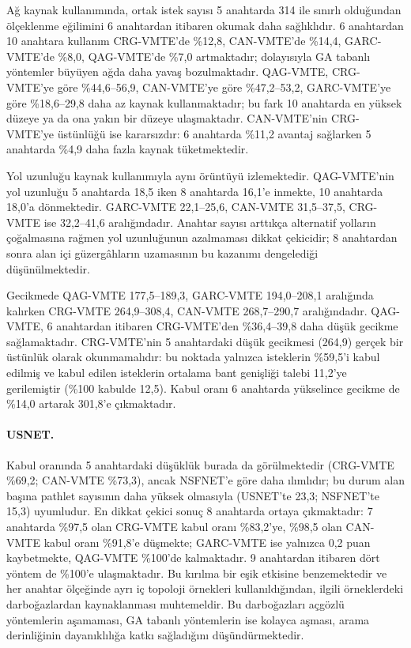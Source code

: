 \documentclass[10pt,twocolumn]{article}
\begin{document}
Ağ kaynak kullanımında, ortak istek sayısı 5 anahtarda 314 ile sınırlı olduğundan ölçeklenme eğilimini 6 anahtardan itibaren okumak daha sağlıklıdır. 6 anahtardan 10 anahtara kullanım CRG-VMTE'de \%12,8, CAN-VMTE'de \%14,4, GARC-VMTE'de \%8,0, QAG-VMTE'de \%7,0 artmaktadır; dolayısıyla GA tabanlı yöntemler büyüyen ağda daha yavaş bozulmaktadır. QAG-VMTE, CRG-VMTE'ye göre \%44,6--56,9, CAN-VMTE'ye göre \%47,2--53,2, GARC-VMTE'ye göre \%18,6--29,8 daha az kaynak kullanmaktadır; bu fark 10 anahtarda en yüksek düzeye ya da ona yakın bir düzeye ulaşmaktadır. CAN-VMTE'nin CRG-VMTE'ye üstünlüğü ise kararsızdır: 6 anahtarda \%11,2 avantaj sağlarken 5 anahtarda \%4,9 daha fazla kaynak tüketmektedir.

Yol uzunluğu kaynak kullanımıyla aynı örüntüyü izlemektedir. QAG-VMTE'nin yol uzunluğu 5 anahtarda 18,5 iken 8 anahtarda 16,1'e inmekte, 10 anahtarda 18,0'a dönmektedir. GARC-VMTE 22,1--25,6, CAN-VMTE 31,5--37,5, CRG-VMTE ise 32,2--41,6 aralığındadır. Anahtar sayısı arttıkça alternatif yolların çoğalmasına rağmen yol uzunluğunun azalmaması dikkat çekicidir; 8 anahtardan sonra alan içi güzergâhların uzamasının bu kazanımı dengelediği düşünülmektedir.

Gecikmede QAG-VMTE 177,5--189,3, GARC-VMTE 194,0--208,1 aralığında kalırken CRG-VMTE 264,9--308,4, CAN-VMTE 268,7--290,7 aralığındadır. QAG-VMTE, 6 anahtardan itibaren CRG-VMTE'den \%36,4--39,8 daha düşük gecikme sağlamaktadır. CRG-VMTE'nin 5 anahtardaki düşük gecikmesi (264,9) gerçek bir üstünlük olarak okunmamalıdır: bu noktada yalnızca isteklerin \%59,5'i kabul edilmiş ve kabul edilen isteklerin ortalama bant genişliği talebi 11,2'ye gerilemiştir (\%100 kabulde 12,5). Kabul oranı 6 anahtarda yükselince gecikme de \%14,0 artarak 301,8'e çıkmaktadır.

\paragraph{USNET.} Kabul oranında 5 anahtardaki düşüklük burada da görülmektedir (CRG-VMTE \%69,2; CAN-VMTE \%73,3), ancak NSFNET'e göre daha ılımlıdır; bu durum alan başına pathlet sayısının daha yüksek olmasıyla (USNET'te 23,3; NSFNET'te 15,3) uyumludur. En dikkat çekici sonuç 8 anahtarda ortaya çıkmaktadır: 7 anahtarda \%97,5 olan CRG-VMTE kabul oranı \%83,2'ye, \%98,5 olan CAN-VMTE kabul oranı \%91,8'e düşmekte; GARC-VMTE ise yalnızca 0,2 puan kaybetmekte, QAG-VMTE \%100'de kalmaktadır. 9 anahtardan itibaren dört yöntem de \%100'e ulaşmaktadır. Bu kırılma bir eşik etkisine benzemektedir ve her anahtar ölçeğinde ayrı iç topoloji örnekleri kullanıldığından, ilgili örneklerdeki darboğazlardan kaynaklanması muhtemeldir. Bu darboğazları açgözlü yöntemlerin aşamaması, GA tabanlı yöntemlerin ise kolayca aşması, arama derinliğinin dayanıklılığa katkı sağladığını düşündürmektedir.
\end{document}
